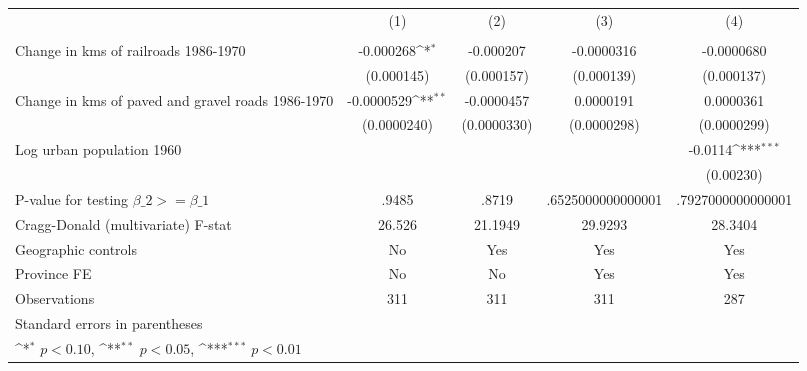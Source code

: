 {
\def\sym#1{\ifmmode^{#1}\else\(^{#1}\)\fi}
\begin{tabular}{l*{4}{c}}
\hline\hline
                &\multicolumn{1}{c}{(1)}&\multicolumn{1}{c}{(2)}&\multicolumn{1}{c}{(3)}&\multicolumn{1}{c}{(4)}\\
                &\multicolumn{1}{c}{}&\multicolumn{1}{c}{}&\multicolumn{1}{c}{}&\multicolumn{1}{c}{}\\
\hline
Change in kms of railroads 1986-1970&-0.000268\sym{*}  &-0.000207         &-0.0000316         &-0.0000680         \\
                &(0.000145)         &(0.000157)         &(0.000139)         &(0.000137)         \\
[1em]
Change in kms of paved and gravel roads 1986-1970&-0.0000529\sym{**} &-0.0000457         &0.0000191         &0.0000361         \\
                &(0.0000240)         &(0.0000330)         &(0.0000298)         &(0.0000299)         \\
[1em]
Log urban population 1960&                  &                  &                  &  -0.0114\sym{***}\\
                &                  &                  &                  &(0.00230)         \\
\hline
P-value for testing $\beta\_{2} >= \beta\_{1}$&    .9485         &    .8719         &.6525000000000001         &.7927000000000001         \\
Cragg-Donald (multivariate) F-stat&   26.526         &  21.1949         &  29.9293         &  28.3404         \\
Geographic controls&       No         &      Yes         &      Yes         &      Yes         \\
Province FE     &       No         &       No         &      Yes         &      Yes         \\
Observations    &      311         &      311         &      311         &      287         \\
\hline\hline
\multicolumn{5}{l}{\footnotesize Standard errors in parentheses}\\
\multicolumn{5}{l}{\footnotesize \sym{*} \(p<0.10\), \sym{**} \(p<0.05\), \sym{***} \(p<0.01\)}\\
\end{tabular}
}
